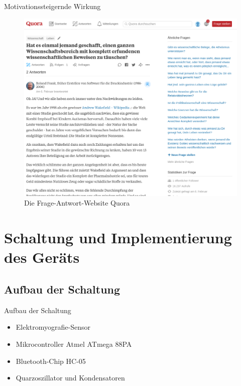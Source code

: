 \documentclass[hyphens]{beamer}
\begin{document}
\begin{frame}{Motivationssteigernde Wirkung}
\begin{figure}
	\includegraphics[scale=0.16]{pics/quora}
	\caption{Die Frage-Antwort-Website Quora}
\end{figure}
\end{frame}

\section{Schaltung und Implementierung des Geräts}

\subsection{Aufbau der Schaltung}

\begin{frame}{Aufbau der Schaltung}
	\begin{itemize}[<+->]
		\item Elektromyografie-Sensor
		\item Mikrocontroller Atmel ATmega 88PA
		\item Bluetooth-Chip HC-05
		\item Quarzoszillator und Kondensatoren
	\end{itemize}
\end{frame}
\end{document}
